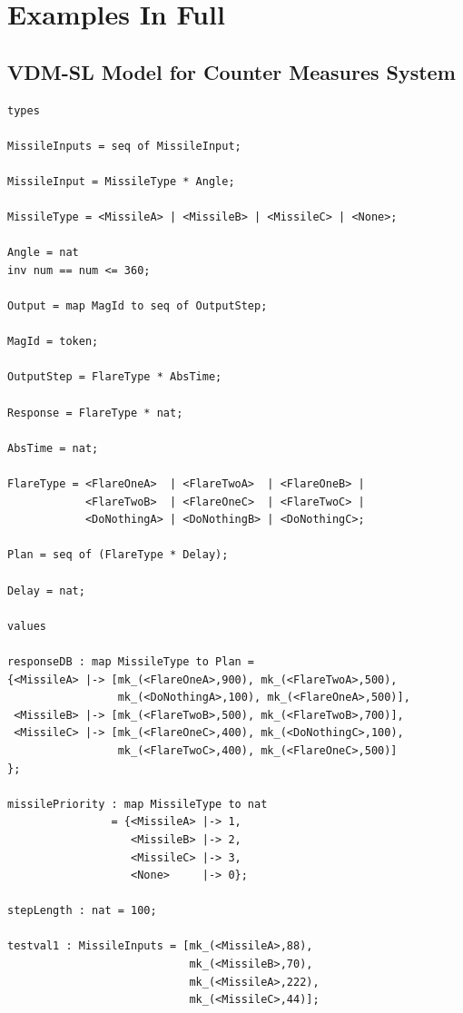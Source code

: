 \documentclass{overturerepchap}
\begin{document}
\chapter{Examples In Full}\label{app:listing}

\section{VDM-SL Model for Counter Measures System}\label{app:VDMSLmodel}

\begin{lstlisting}
types

MissileInputs = seq of MissileInput;

MissileInput = MissileType * Angle;

MissileType = <MissileA> | <MissileB> | <MissileC> | <None>;

Angle = nat
inv num == num <= 360;

Output = map MagId to seq of OutputStep;

MagId = token;

OutputStep = FlareType * AbsTime;

Response = FlareType * nat;

AbsTime = nat;

FlareType = <FlareOneA>  | <FlareTwoA>  | <FlareOneB> |
            <FlareTwoB>  | <FlareOneC>  | <FlareTwoC> |
            <DoNothingA> | <DoNothingB> | <DoNothingC>;

Plan = seq of (FlareType * Delay);

Delay = nat;

values

responseDB : map MissileType to Plan =
{<MissileA> |-> [mk_(<FlareOneA>,900), mk_(<FlareTwoA>,500),
                 mk_(<DoNothingA>,100), mk_(<FlareOneA>,500)],
 <MissileB> |-> [mk_(<FlareTwoB>,500), mk_(<FlareTwoB>,700)],
 <MissileC> |-> [mk_(<FlareOneC>,400), mk_(<DoNothingC>,100),
                 mk_(<FlareTwoC>,400), mk_(<FlareOneC>,500)]
};

missilePriority : map MissileType to nat
                = {<MissileA> |-> 1,
                   <MissileB> |-> 2,
                   <MissileC> |-> 3,
                   <None>     |-> 0};

stepLength : nat = 100;

testval1 : MissileInputs = [mk_(<MissileA>,88),
                            mk_(<MissileB>,70),
                            mk_(<MissileA>,222),
                            mk_(<MissileC>,44)];


\end{lstlisting}
\end{document}
